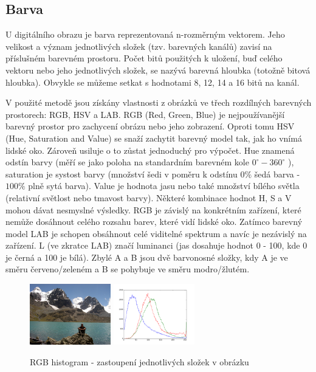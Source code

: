 \documentclass[czech,BP]{thesiskiv}
\begin{document}
\subsection{Barva}
\par U digitálního obrazu je barva reprezentovaná n-rozměrným vektorem. Jeho velikost a význam jednotlivých složek (tzv. barevných kanálů) zavisí na příslušném barevném prostoru. Počet bitů použitých k uložení, buď celého vektoru nebo jeho jednotlivých složek, se nazývá barevná hloubka (totožně bitová hloubka). Obvykle se můžeme setkat s hodnotami 8, 12, 14 a 16 bitů na kanál. 

\par V použité metodě jsou získány vlastnosti z obrázků ve třech rozdílných barevných prostorech: RGB, HSV a LAB. RGB (Red, Green, Blue) je nejpoužívanější barevný prostor pro zachycení obrázu nebo jeho zobrazení. Oproti tomu HSV (Hue, Saturation and Value) se snaží zachytit barevný model tak, jak ho vnímá lidské oko. Zároveň usiluje o to zůstat jednoduchý pro výpočet. Hue znamená odstín barvy (měří se jako poloha na standardním barevném kole $0^{\circ} - 360^{\circ}$ ), saturation je systost barvy (množství šedi v poměru k odstínu $0 \%$ šedá barva - $100 \%$ plně sytá barva). Value je hodnota jasu nebo také množství bílého světla (relativní světlost nebo tmavost barvy). Některé kombinace hodnot H, S a V mohou dávat nesmyslné výsledky. RGB je závislý na konkrétním zařízení, které nemůže dosáhnout celého rozsahu barev, které vidí lidské oko. Zatímco barevný model LAB je schopen obsáhnout celé viditelné spektrum a navíc je nezávislý na zařízení. L (ve zkratce LAB) značí luminanci (jas dosahuje hodnot 0 - 100, kde 0 je černá a 100 je bílá). Zbylé A a B jsou dvě barvonosné složky, kdy A je ve směru červeno/zeleném a B se pohybuje ve směru modro/žlutém.

\begin{figure}[H]
		\centering
		\includegraphics[height=100px]{./img/img_histogram.jpg}	
		\includegraphics[height=100px]{./img/bgr_histogram.png}	
		\caption{RGB histogram - zastoupení jednotlivých složek v obrázku}
\end{figure}
\end{document}
